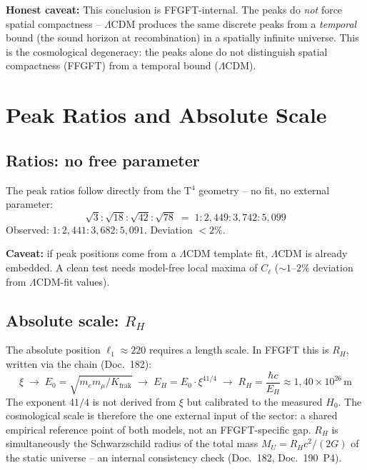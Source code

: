\textbf{Honest caveat:} This conclusion is FFGFT-internal. The peaks do
\emph{not} force spatial compactness -- $\Lambda$CDM produces the same
discrete peaks from a \emph{temporal} bound (the sound horizon at
recombination) in a spatially infinite universe. This is the cosmological
degeneracy: the peaks alone do not distinguish spatial compactness (FFGFT)
from a temporal bound ($\Lambda$CDM).

\section{Peak Ratios and Absolute Scale}

\subsection*{Ratios: no free parameter}

The peak ratios follow directly from the T$^4$ geometry --
no fit, no external parameter:
\[
  \sqrt{3}:\sqrt{18}:\sqrt{42}:\sqrt{78}
  \;=\; 1:2{,}449:3{,}742:5{,}099
\]
Observed: $1:2{,}441:3{,}682:5{,}091$. Deviation $< 2\%$.

\textbf{Caveat:} if peak positions come from a $\Lambda$CDM template
fit, $\Lambda$CDM is already embedded. A clean test needs model-free
local maxima of $C_\ell$ ($\sim 1$--$2\%$ deviation from
$\Lambda$CDM-fit values).

\subsection*{Absolute scale: $R_H$}

The absolute position $\ell_1 \approx 220$ requires a length scale.
In FFGFT this is $R_H$, written via the chain (Doc.~182):
\[
  \xi \;\to\; E_0 = \sqrt{m_e m_\mu/K_{\text{frak}}} \;\to\;
  E_H = E_0 \cdot \xi^{41/4} \;\to\;
  R_H = \frac{\hbar c}{E_H} \approx 1{,}40 \times 10^{26}\,\text{m}
\]
The exponent $41/4$ is not derived from $\xi$ but calibrated to the measured
$H_0$. The cosmological scale is therefore the one external input of the
sector: a shared empirical reference point of both models, not an
FFGFT-specific gap. $R_H$ is simultaneously the Schwarzschild radius
of the total mass $M_U = R_H c^2/(2G)$ of the static universe --
an internal consistency check (Doc.~182, Doc.~190~P4).

